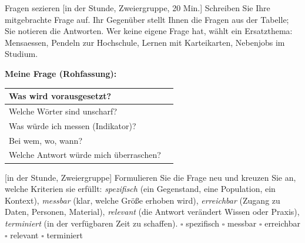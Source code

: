 \begin{uebungsblatt}{Fragen sezieren}
[in der Stunde, Zweiergruppe, 20 Min.]
Schreiben Sie Ihre mitgebrachte Frage auf. Ihr Gegenüber stellt Ihnen die
Fragen aus der Tabelle; Sie notieren die Antworten. Wer keine eigene Frage hat, wählt
ein Ersatzthema: Mensaessen, Pendeln zur Hochschule, Lernen mit Karteikarten,
Nebenjobs im Studium.

\smallskip
\noindent\textbf{Meine Frage (Rohfassung):}

\begin{center}
\renewcommand{\arraystretch}{2.0}
\begin{tabular}{|p{}|p{}|}
\hline
Was wird vorausgesetzt? & \\ \hline
Welche Wörter sind unscharf? & \\ \hline
Was würde ich messen (Indikator)? & \\ \hline
Bei wem, wo, wann? & \\ \hline
Welche Antwort würde mich überraschen? & \\ \hline
\end{tabular}
\end{center}

[in der Stunde, Zweiergruppe]
Formulieren Sie die Frage neu und kreuzen Sie an, welche Kriterien sie
erfüllt: \emph{spezifisch} (ein Gegenstand, eine Population, ein Kontext),
\emph{messbar} (klar, welche Größe erhoben wird), \emph{erreichbar}
(Zugang zu Daten, Personen, Material), \emph{relevant} (die Antwort
verändert Wissen oder Praxis), \emph{terminiert} (in der verfügbaren Zeit
zu schaffen).
\noindent$\square$ spezifisch \quad $\square$ messbar \quad
$\square$ erreichbar \quad $\square$ relevant \quad $\square$ terminiert
\end{uebungsblatt}

